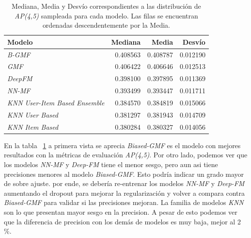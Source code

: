 \documentclass[11pt,a4paper,twoside]{thesis}
\begin{document}
{\begin{table}[!htb]
	\centering
	\footnotesize
	\begin{tabular}{lrrr}
	\hline
		Modelo                            & Mediana  & Media    & Desvío  \\
	\hline
	\textit{B-GMF}                        & 0.408563 & 0.408787 & 0.012190 \\
	\textit{GMF}                          & 0.406422 & 0.406646 & 0.012513 \\
	\textit{DeepFM}                       & 0.398100 & 0.397895 & 0.011369 \\
	\textit{NN-MF}                        & 0.393499 & 0.393447 & 0.011711 \\
	\textit{KNN User-Item Based Ensemble} & 0.384570 & 0.384819 & 0.015066 \\
	\textit{KNN User Based}               & 0.381297 & 0.381943 & 0.014709 \\
	\textit{KNN Item Based}               & 0.380284 & 0.380327 & 0.014056 \\
	\hline
	\end{tabular}
	\caption{
		Mediana, Media y Desvío correspondientes a las distribución de 
		\textit{AP(4,5)} sampleada para cada modelo. Las filas se encuentran ordenadas descendentemente por la Media.
	}
	\label{table:ap_at_k}
\end{table}

En la tabla ~\ref{table:ap_at_k} a primera vista se aprecia \textit{Biased-GMF} es el modelo con mejores resultados con la métricas de evaluación \textit{AP(4,5)}.  Por otro lado, podemos ver que los modelos \textit{NN-MF} y \textit{Deep-FM} tiene el menor sesgo, pero aun asi tiene precisiones menores al modelo \textit{Biased-GMF}. Esto podría indicar un grado mayor de sobre ajuste. por ende, se debería re-entrenar los modelos \textit{NN-MF} y \textit{Deep-FM} aumentando el dropout para mejorar la regularización y volver a compara contra \textit{Biased-GMF} para validar si las precisiones mejoran. La familia de modelos \textit{KNN} son lo que presentan mayor sesgo en la precision. A pesar de esto podemos ver que la diferencia de precision con los demás de modelos es muy baja, mejor al 2 \%.


}
\end{document}
